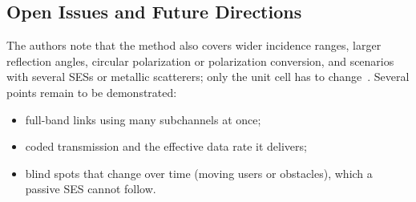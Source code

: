 \subsection{Open Issues and Future Directions}
The authors note that the method also covers wider incidence ranges, larger reflection angles, circular polarization or polarization conversion, and scenarios with several SESs or metallic scatterers; only the unit cell has to change~\cite{Vaquero2026}. Several points remain to be demonstrated:
\begin{itemize}
    \item full-band links using many subchannels at once;
    \item coded transmission and the effective data rate it delivers;
    \item blind spots that change over time (moving users or obstacles), which a passive SES cannot follow.
\end{itemize}
